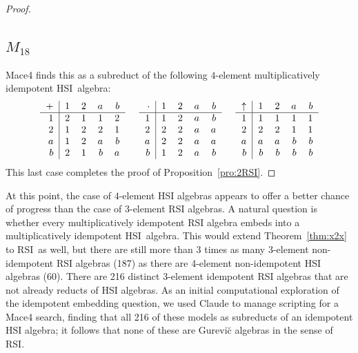 \documentclass[eqnor,reqno]{amsart}
\theoremstyle{plain}
\theoremstyle{definition}
\newcommand{\RSI}{\textsf{RSI}}
\begin{document}
\begin{proof}
\subsection{$M_{18}$} Mace4 finds this as a subreduct of the following $4$-element multiplicatively idempotent HSI~algebra:
\[ 
\begin{tabular}{r|rrrr}
$+$ & $1$ & $2$ & $a$ & $b$\\
\hline
    $1$ & $2$ & $1$ & $1$ & $2$ \\
    $2$ & $1$ & $2$ & $2$ & $1$ \\
    $a$ & $1$ & $2$ & $a$ & $b$ \\
    $b$ & $2$ & $1$ & $b$ & $a$
\end{tabular} \hspace{.5cm}
\begin{tabular}{r|rrrr}
$\cdot$ & $1$ & $2$ & $a$ & $b$\\
\hline
    $1$ & $1$ & $2$ & $a$ & $b$ \\
    $2$ & $2$ & $2$ & $a$ & $a$ \\
    $a$ & $2$ & $2$ & $a$ & $a$ \\
    $b$ & $1$ & $2$ & $a$ & $b$
\end{tabular} \hspace{.5cm}
\begin{tabular}{r|rrrr}
$\uparrow$ & $1$ & $2$ & $a$ & $b$\\
\hline
    $1$ & $1$ & $1$ & $1$ & $1$ \\
    $2$ & $2$ & $2$ & $1$ & $1$ \\
    $a$ & $a$ & $a$ & $b$ & $b$ \\
    $b$ & $b$ & $b$ & $b$ & $b$
\end{tabular}
\]
This last case completes the proof of Proposition~\ref{pro:2RSI}.
\end{proof}
At this point, the case of $4$-element HSI algebras appears to offer a better chance of progress than the case of $3$-element RSI algebras.
A natural question is whether every multiplicatively idempotent RSI algebra embeds into a multiplicatively idempotent HSI~algebra.  
This would extend Theorem~\ref{thm:x2x} to \RSI\ as well, but there are still more than 3 times as many 3-element  non-idempotent RSI algebras (187) as there are 4-element non-idempotent HSI algebras (60).
There are 216 distinct 3-element idempotent RSI algebras that are not already reducts of HSI algebras.  
As an initial computational exploration of the idempotent embedding question, we used Claude to manage scripting for a Mace4 search, finding that all 216 of these models as subreducts of an idempotent HSI algebra; it follows that none of these are Gurevi\u{c} algebras in the sense of RSI. 
\end{document}
